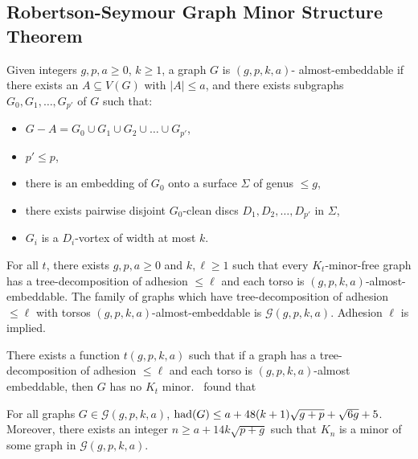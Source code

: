 \subsection{Robertson-Seymour Graph Minor Structure Theorem}\label{ssec:Robertson_Seymour_Graph_Structure}
Given integers \(g, p, a \geq 0\), \(k \geq 1\), a graph \(G\) is \((g, p, k, a)\)- almost-embeddable if there exists an \(A \subseteq V(G)\) with \(|A| \leq a\), and there exists subgraphs \(G_0, G_1, \ldots,  G_{p'}\) of \(G\) such that:
\begin{itemize}
	\item \(G - A = G_0 \cup G_1 \cup G_2 \cup \ldots \cup G_{p'}\),
	\item \(p' \leq p\),
	\item there is an embedding of \(G_0\) onto a surface \(\Sigma\) of genus \(\leq g\),
	\item there exists pairwise disjoint \(G_0\)-clean discs \(D_1, D_2, \ldots, D_{p'}\) in \(\Sigma\),
	\item \(G_i\) is a \(D_i\)-vortex of width at most \(k\).
\end{itemize}

\begin{theorem}\label{thm:gmst}
	For all \(t\), there exists \(g, p, a \geq 0\) and \(k, \ell \geq 1\) such that every \(K_t\)-minor-free graph has a tree-decomposition of adhesion \(\leq \ell\) and each torso is \((g, p, k, a)\)-almost-embeddable. The  family of graphs which have tree-decomposition of adhesion $\leq \ell$ with torsos $(g, p, k, a)$-almost-embeddable is \(\mathcal{G}(g, p, k, a)\). Adhesion $\ell$ is implied. 
\end{theorem}
There exists a function \(t(g, p, k, a)\) such that if a graph has a tree-decomposition of adhesion \(\leq \ell\) and each torso is \((g, p, k, a)\)-almost embeddable, then \(G\) has no \(K_t\) minor.\ \textcite{joretCompleteGraphMinors2013} found that
\begin{theorem}\label{thm:graph_structure_bound_theorem}
	For all graphs \(G \in \mathcal{G}(g, p, k, a)\),
	\(\operatorname{had}(G) \leq a + 48(k + 1)\sqrt{g + p} + \sqrt{6g} + 5\). Moreover, there exists an integer \(n \geq a + 1 4 k\sqrt{p + g}\) such that \(K_n\) is a minor of some graph in \(\mathcal{G}(g, p, k, a)\).
\end{theorem}

